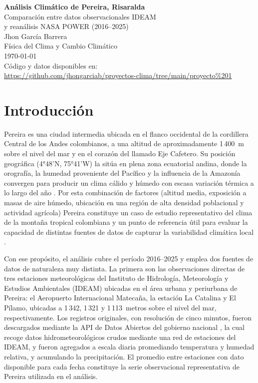 \documentclass[12pt, a4paper]{article}
\begin{document}
	
	\begin{titlepage}
		\centering
		\vspace*{2cm}
		{\LARGE \textbf{Análisis Climático de Pereira, Risaralda}\\[0.5em]
			\large Comparación entre datos observacionales IDEAM\\
			y reanálisis NASA POWER (2016–2025)}\\[2cm]
		{\large Jhon García Barrera}\\[0.5em]
		{\normalsize Física del Clima y Cambio Climático}\\[0.5em]
		{\normalsize \today}\\[3cm]
		\vfill
		{\small Código y datos disponibles en:\\
			\url{https://github.com/jhongarciab/proyectos-clima/tree/main/proyecto%201}}
	\end{titlepage}
	
	\tableofcontents
	\newpage

\section{Introducción}

Pereira es una ciudad intermedia ubicada en el flanco occidental de la cordillera
Central de los Andes colombianos, a una altitud de aproximadamente 1\,400~m sobre el
nivel del mar y en el corazón del llamado Eje Cafetero. Su posición geográfica
(4°48'N, 75°41'W) la sitúa en plena zona ecuatorial andina, donde la orografía, la
humedad proveniente del Pacífico y la influencia de la Amazonía convergen para producir
un clima cálido y húmedo con escasa variación térmica a lo largo del año \cite{poveda2004}.
Por esta combinación de factores (altitud media, exposición a masas de aire húmedo,
ubicación en una región de alta densidad poblacional y actividad agrícola) Pereira
constituye un caso de estudio representativo del clima de la montaña tropical colombiana
y un punto de referencia útil para evaluar la capacidad de distintas fuentes de datos
de capturar la variabilidad climática local \cite{urrea2019}.

Con ese propósito, el análisis cubre el período 2016--2025 y emplea dos fuentes de
datos de naturaleza muy distinta. La primera son las observaciones directas de tres
estaciones meteorológicas del Instituto de Hidrología, Meteorología y Estudios
Ambientales (IDEAM) ubicadas en el área urbana y periurbana de Pereira: el Aeropuerto
Internacional Matecaña, la estación La Catalina y El Pílamo, ubicadas a 1\,342,
1\,321 y 1\,113~metros sobre el nivel del mar, respectivamente. Los registros
originales, con resolución de cinco minutos, fueron descargados mediante la API de
Datos Abiertos del gobierno nacional \cite{ideam_temperatura, ideam_humedad,
	ideam_precipitacion}, la cual recoge datos hidrometeorológicos crudos mediante una
red de estaciones del IDEAM, y fueron agregados a escala diaria promediando temperatura
y humedad relativa, y acumulando la precipitación. El promedio entre estaciones con
dato disponible para cada fecha constituye la serie observacional representativa de
Pereira utilizada en el análisis.
\end{document}
